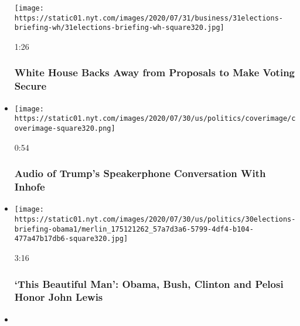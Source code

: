 \begin{itemize}
  \texttt{[image: https://static01.nyt.com/images/2020/07/31/business/31elections-briefing-wh/31elections-briefing-wh-square320.jpg]}

  1:26

  \hypertarget{white-house-backs-away-from-proposals-to-make-voting-secure}{%
  \subsubsection{White House Backs Away from Proposals to Make Voting
  Secure}\label{white-house-backs-away-from-proposals-to-make-voting-secure}}
\item
  \href{https://www.nytimes.com/video/us/politics/100000007265038/trump-inhofe-audio-call.html?action=click\&module=video-series-bar\&region=header\&pgtype=Article\&playlistId=video/us-politics}{}

  \texttt{[image: https://static01.nyt.com/images/2020/07/30/us/politics/coverimage/coverimage-square320.png]}

  0:54

  \hypertarget{audio-of-trumps-speakerphone-conversation-with-inhofe}{%
  \subsubsection{Audio of Trump's Speakerphone Conversation With
  Inhofe}\label{audio-of-trumps-speakerphone-conversation-with-inhofe}}
\item
  \href{https://www.nytimes.com/video/us/politics/100000007264823/john-lewis-funeral.html?action=click\&module=video-series-bar\&region=header\&pgtype=Article\&playlistId=video/us-politics}{}

  \texttt{[image: https://static01.nyt.com/images/2020/07/30/us/politics/30elections-briefing-obama1/merlin\_175121262\_57a7d3a6-5799-4df4-b104-477a47b17db6-square320.jpg]}

  3:16

  \hypertarget{this-beautiful-man-obama-bush-clinton-and-pelosi-honor-john-lewis}{%
  \subsubsection{`This Beautiful Man': Obama, Bush, Clinton and Pelosi
  Honor John
  Lewis}\label{this-beautiful-man-obama-bush-clinton-and-pelosi-honor-john-lewis}}
\item
  \href{https://www.nytimes.com/video/us/politics/100000007264379/john-lewis-funeral.html?action=click\&module=video-series-bar\&region=header\&pgtype=Article\&playlistId=video/us-politics}{}


\end{itemize}
